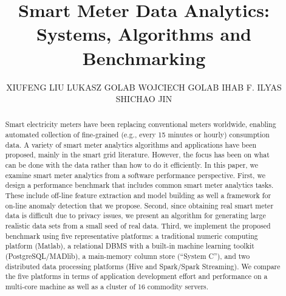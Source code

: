 \documentclass[prodmode,acmtods]{acmsmall}
\begin{document}
\newcommand{\new}[1]{\textcolor{blue}{#1}}


\title{Smart Meter Data Analytics: Systems, Algorithms and Benchmarking}
\author{XIUFENG LIU
LUKASZ GOLAB
WOJCIECH GOLAB
IHAB F. ILYAS
SHICHAO JIN
}

\begin{abstract}

Smart electricity meters have been replacing conventional meters worldwide, enabling automated collection of fine-grained (e.g., every 15 minutes or hourly) consumption data.  A variety of smart meter analytics algorithms and applications have been proposed, mainly in the smart grid literature.  However, the focus has been on what can be done with the data rather than how to do it efficiently.  In this paper, we examine smart meter analytics from a software performance perspective.  First, we design a performance benchmark that includes common smart meter analytics tasks.  These include off-line feature extraction and model building as well a framework for on-line anomaly detection that we propose.  Second, since obtaining real smart meter data is difficult due to privacy issues, we present an algorithm for generating large realistic data sets from a small seed of real data.  Third, we implement the proposed benchmark using five representative platforms: a traditional numeric computing platform (Matlab), a relational DBMS with a built-in machine learning toolkit (PostgreSQL/MADlib), a main-memory column store (``System C''), and two distributed data processing platforms (Hive and Spark/Spark Streaming).  We compare the five platforms in terms of application development effort and performance on a multi-core machine as well as a cluster of 16 commodity servers.  

\end{abstract}

\end{document}

